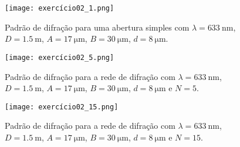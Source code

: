 \begin{figure}[H]
    \centering
    \texttt{[image: exercício02\_1.png]}
    \caption{Padrão de difração para uma abertura simples com \(\lambda = \SI{633}{\nano\meter}\), \(D = \SI{1.5}{\meter}\), \(A = \SI{17}{\micro\meter}\), \(B = \SI{30}{\micro\meter}\), \(d = \SI{8}{\micro\meter}\).}
\end{figure}
\begin{figure}[H]
    \centering
    \texttt{[image: exercício02\_5.png]}
    \caption{Padrão de difração para a rede de difração com \(\lambda = \SI{633}{\nano\meter}\), \(D = \SI{1.5}{\meter}\), \(A = \SI{17}{\micro\meter}\), \(B = \SI{30}{\micro\meter}\), \(d = \SI{8}{\micro\meter}\) e \(N = 5.\)}
\end{figure}
\begin{figure}[H]
    \centering
    \texttt{[image: exercício02\_15.png]}
    \caption{Padrão de difração para a rede de difração com \(\lambda = \SI{633}{\nano\meter}\), \(D = \SI{1.5}{\meter}\), \(A = \SI{17}{\micro\meter}\), \(B = \SI{30}{\micro\meter}\), \(d = \SI{8}{\micro\meter}\) e \(N = 15.\)}
\end{figure}
